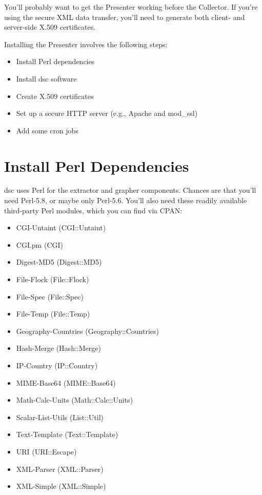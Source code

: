 \documentclass{report}
\def\dsc{{\sc dsc}}
\begin{document}
You'll probably want to get the Presenter working before the Collector.
If you're using the secure XML data transfer, you'll need to
generate both client- and server-side X.509 certificates.

Installing the Presenter involves the following steps:
\begin{itemize}
\setlength{\itemsep}{0ex plus 0.5ex minus 0.0ex}
\item
	Install Perl dependencies
\item
	Install {\dsc} software
\item
	Create X.509 certificates
\item
	Set up a secure HTTP server (e.g., Apache and mod\_ssl)
\item
	Add some cron jobs
\end{itemize}


\section{Install Perl Dependencies}

{\dsc} uses Perl for the extractor and grapher components.  Chances are
that you'll need Perl-5.8, or maybe only Perl-5.6.  You'll also need
these readily available third-party Perl modules, which you
can find via CPAN:

\begin{itemize}
\setlength{\itemsep}{0ex plus 0.5ex minus 0.0ex}
	\item CGI-Untaint (CGI::Untaint)
	\item CGI.pm (CGI)
	\item Digest-MD5 (Digest::MD5)
	\item File-Flock (File::Flock)
	\item File-Spec (File::Spec)
	\item File-Temp (File::Temp)
	\item Geography-Countries (Geography::Countries)
	\item Hash-Merge (Hash::Merge)
	\item IP-Country (IP::Country)
	\item MIME-Base64 (MIME::Base64)
	\item Math-Calc-Units (Math::Calc::Units)
	\item Scalar-List-Utils (List::Util)
	\item Text-Template (Text::Template)
	\item URI (URI::Escape)
	\item XML-Parser (XML::Parser)
	\item XML-Simple (XML::Simple)

\end{itemize}
\end{document}
